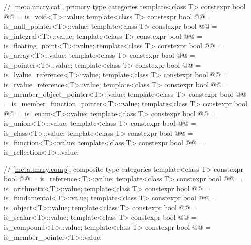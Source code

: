 \begin{codeblock}
{  // \ref{meta.unary.cat}, primary type categories
  template<class T>
    constexpr bool @@ = is_void<T>::value;
  template<class T>
    constexpr bool @@ = is_null_pointer<T>::value;
  template<class T>
    constexpr bool @@ = is_integral<T>::value;
  template<class T>
    constexpr bool @@ = is_floating_point<T>::value;
  template<class T>
    constexpr bool @@ = is_array<T>::value;
  template<class T>
    constexpr bool @@ = is_pointer<T>::value;
  template<class T>
    constexpr bool @@ = is_lvalue_reference<T>::value;
  template<class T>
    constexpr bool @@ = is_rvalue_reference<T>::value;
  template<class T>
    constexpr bool @@ = is_member_object_pointer<T>::value;
  template<class T>
    constexpr bool @@ = is_member_function_pointer<T>::value;
  template<class T>
    constexpr bool @@ = is_enum<T>::value;
  template<class T>
    constexpr bool @@ = is_union<T>::value;
  template<class T>
    constexpr bool @@ = is_class<T>::value;
  template<class T>
    constexpr bool @@ = is_function<T>::value;
  template<class T>
    constexpr bool @@ = is_reflection<T>::value;

  // \ref{meta.unary.comp}, composite type categories
  template<class T>
    constexpr bool @@ = is_reference<T>::value;
  template<class T>
    constexpr bool @@ = is_arithmetic<T>::value;
  template<class T>
    constexpr bool @@ = is_fundamental<T>::value;
  template<class T>
    constexpr bool @@ = is_object<T>::value;
  template<class T>
    constexpr bool @@ = is_scalar<T>::value;
  template<class T>
    constexpr bool @@ = is_compound<T>::value;
  template<class T>
    constexpr bool @@ = is_member_pointer<T>::value;

}
\end{codeblock}
